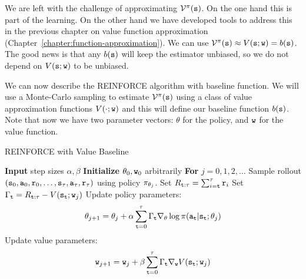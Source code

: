 We are left with the challenge of approximating
$\mathcal{V}^\pi({\tt s})$. On the one hand this is part of the
learning. On the other hand we have developed tools to address this
in the previous chapter on value function approximation (Chapter~\ref{chapter:function-approximation}). We can use
$\mathcal{V}^\pi({\tt s})\approx V({\tt s};{\tt w})=b({\tt s})$. The
good news is that any $b({\tt s})$ will keep the estimator unbiased,
so we do not depend on $V({\tt s};{\tt w})$ to be unbiased.

We can now describe the REINFORCE algorithm with baseline function.
We will use a Monte-Carlo sampling to estimate
$\mathcal{V}^\pi({\tt s})$ using a class of value approximation functions $V(\cdot;{\tt w})$ and this will define our baseline function
$b({\tt s})$. Note that now we have two parameter vectors: $\theta$ for the policy, and ${\tt w}$ for the value function.

\begin{algorithm}[H]
\caption{REINFORCE with Value Baseline}
\begin{algorithmic}[1]
\State \textbf{Input} step sizes $\alpha,\beta$
\State \textbf{Initialize} $\theta_0, {\tt w}_0$ arbitrarily
\State \textbf{For} $j = 0,1,2,\dots$
\State \quad Sample rollout $({\tt s}_0, {\tt a}_0, {\tt r}_0, \ldots, {\tt s}_\tau, {\tt a}_\tau, {\tt r}_\tau)$ using policy $\pi_{\theta_j}$.
\State \quad Set $R_{{\tt t}:\tau} = \sum_{i={\tt t}}^\tau {\tt r}_i$
\State \quad Set $\Gamma_{\tt t} = R_{{\tt t}:\tau}-V({\tt s}_{\tt t};{\tt w}_j)$
\State \quad Update policy parameters:
\[
\theta_{j+1} = \theta_j + \alpha \sum_{{\tt t}=0}^{\tau} \Gamma_{\tt t} \nabla_\theta \log \pi({\tt a}_{\tt t} | {\tt s}_{\tt t}; \theta_j)
\]
\State \quad Update value parameters:
\[
{\tt w}_{j+1} = {\tt w}_j + \beta \sum_{{\tt t}=0}^{\tau} \Gamma_{\tt t} \nabla_{{\tt w}} V({\tt s}_{\tt t};{\tt w}_j)
\]
\end{algorithmic}
\end{algorithm}

